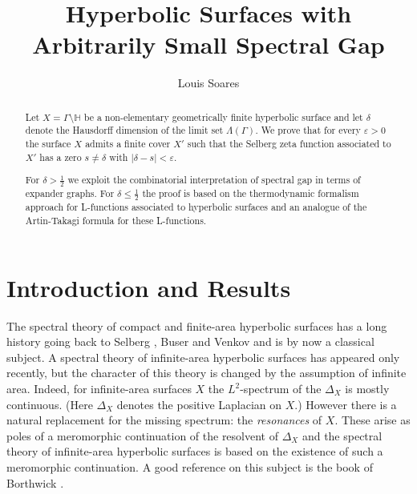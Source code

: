 \documentclass[12pt]{article}
\newcommand{\HH}{\mathbb{H}}
\begin{document}
\date{}
\title{Hyperbolic Surfaces with Arbitrarily Small Spectral Gap}
\author{Louis Soares}
\maketitle

\begin{abstract}
Let $ X = \Gamma\setminus \HH $ be a non-elementary geometrically finite hyperbolic surface and let $ \delta $ denote the Hausdorff dimension of the limit set $ \Lambda(\Gamma) $. We prove that for every $ \varepsilon > 0 $ the surface $ X $ admits a finite cover $ X' $ such that the Selberg zeta function associated to $ X' $ has a zero $ s\neq \delta $ with $ \vert \delta - s\vert < \varepsilon  $.

For $ \delta > \frac{1}{2} $ we exploit the combinatorial interpretation of spectral gap in terms of expander graphs.
For $ \delta \leq \frac{1}{2} $ the proof is based on the thermodynamic formalism approach for L-functions associated to hyperbolic surfaces and an analogue of the Artin-Takagi formula for these L-functions.
\end{abstract}


\section{Introduction and Results}

The spectral theory of compact and finite-area hyperbolic surfaces has a long history going back to Selberg \cite{Selberg}, Buser \cite{Buser} and Venkov \cite{Venkov} and is by now a classical subject. A spectral theory of infinite-area hyperbolic surfaces has appeared only recently, but the character of this theory is changed by the assumption of infinite area. Indeed, for infinite-area surfaces $ X $ the $ L^{2} $-spectrum of the $ \Delta_{X} $ is mostly continuous. (Here $ \Delta_{X} $ denotes the positive Laplacian on $ X $.) However there is a natural replacement for the missing spectrum: the \textit{resonances} of $ X $. These arise as poles of a meromorphic continuation of the resolvent of $ \Delta_{X} $ and the spectral theory of infinite-area hyperbolic surfaces is based on the existence of such a meromorphic continuation. A good reference on this subject is the book of Borthwick \cite{Borthwick}.
\end{document}
